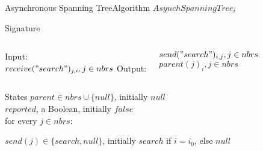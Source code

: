 \documentclass[pdf]{beamer}
\begin{document}
\begin{frame}{Asynchronous Spanning Tree}{Algorithm}
	$AsynchSpanningTree_i$
    \begin{block}{Signature}
        \begin{columns}
            Input:\\
            \hspace*{2pt} 
              {$receive("search")_{j,i}, j \in nbrs$}
            Output:
            \hspace*{2pt}
            \parbox{\textwidth}{$send("search")_{i,j}, j \in nbrs$\\
               $parent(j)_i, j \in nbrs$}
        \end{columns}
    \end{block}
    \begin{block}{States}
        $parent \in nbrs \cup \{null\}$, initially $null$\\
        $reported$, a Boolean, initially $false$\\
        for every $j \in nbrs$:\\
        \hspace*{2pt}
        \parbox{\textwidth}{$send(j) \in \{search,null\}$,
        initially $search$ if $i=i_0$, else $null$}
    \end{block}
\end{frame}
\end{document}
